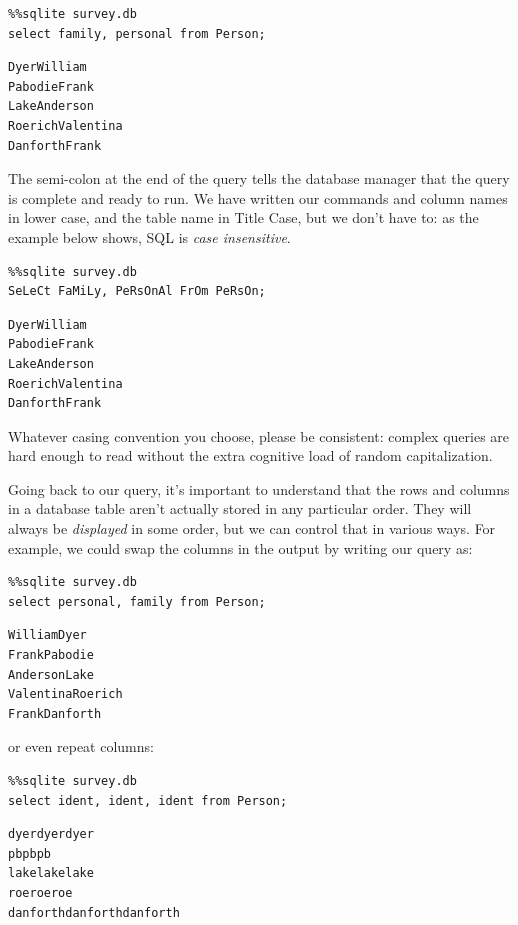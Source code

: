 \documentclass[]{book}
\newcommand{\gdef}[2]{\emph{#2}}
\begin{document}
\begin{verbatim}
%%sqlite survey.db
select family, personal from Person;
\end{verbatim}

\begin{verbatim}
DyerWilliam
PabodieFrank
LakeAnderson
RoerichValentina
DanforthFrank
\end{verbatim}

The semi-colon at the end of the query tells the database manager that
the query is complete and ready to run. We have written our commands and
column names in lower case, and the table name in Title Case, but we
don't have to: as the example below shows, SQL is
\gdef{g:case-insensitive}{case insensitive}.

\begin{verbatim}
%%sqlite survey.db
SeLeCt FaMiLy, PeRsOnAl FrOm PeRsOn;
\end{verbatim}

\begin{verbatim}
DyerWilliam
PabodieFrank
LakeAnderson
RoerichValentina
DanforthFrank
\end{verbatim}

Whatever casing convention you choose, please be consistent: complex
queries are hard enough to read without the extra cognitive load of
random capitalization.

Going back to our query, it's important to understand that the rows and
columns in a database table aren't actually stored in any particular
order. They will always be \emph{displayed} in some order, but we can
control that in various ways. For example, we could swap the columns in
the output by writing our query as:

\begin{verbatim}
%%sqlite survey.db
select personal, family from Person;
\end{verbatim}

\begin{verbatim}
WilliamDyer
FrankPabodie
AndersonLake
ValentinaRoerich
FrankDanforth
\end{verbatim}

or even repeat columns:

\begin{verbatim}
%%sqlite survey.db
select ident, ident, ident from Person;
\end{verbatim}

\begin{verbatim}
dyerdyerdyer
pbpbpb
lakelakelake
roeroeroe
danforthdanforthdanforth
\end{verbatim}
\end{document}
